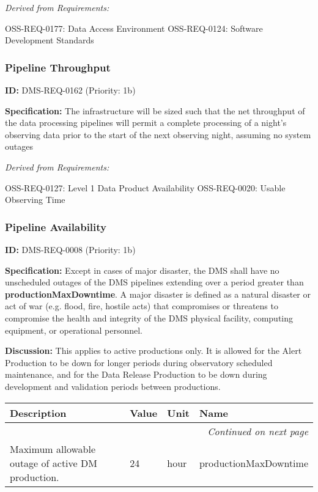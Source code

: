 \documentclass[SE,toc,lsstdraft]{lsstdoc}
\makeatletter
\newcommand{\paramname}[1]{\hspace{0pt}#1}
\newcommand{\unitname}[1]{\hspace{0pt}#1}
\newenvironment{parameters}[0]{%
\setlength\LTleft{0pt}
\setlength\LTright{\fill}
\begin{small}
\begin{longtable}[]{|p{0.49\textwidth}|l|p{0.6in}|p{1.70in}@{}|}

\hline \textbf{Description} & \textbf{Value} & \textbf{Unit} & \textbf{Name} \\ \hline
\endhead

\hline \multicolumn{4}{r}{\emph{Continued on next page}} \\
\endfoot

\hline\hline
\endlastfoot
}{%
\hline
\end{longtable}
\end{small}
}
\makeatother
\begin{document}
\emph{Derived from Requirements:}

OSS-REQ-0177:
Data Access Environment \newline
OSS-REQ-0124:
Software Development Standards \newline

\subsubsection{Pipeline Throughput}

\label{DMS-REQ-0162}
\textbf{ID:} DMS-REQ-0162 (Priority: 1b)

\textbf{Specification:} The infrastructure will be sized such that the net throughput of the data processing pipelines will permit a complete processing of a night’s observing data prior to the start of the next observing night, assuming no system outages

\emph{Derived from Requirements:}

OSS-REQ-0127:
Level 1 Data Product Availability \newline
OSS-REQ-0020:
Usable Observing Time \newline

\subsubsection{Pipeline Availability}

\label{DMS-REQ-0008}
\textbf{ID:} DMS-REQ-0008 (Priority: 1b)

\textbf{Specification:} Except in cases of major disaster, the DMS shall have no unscheduled outages of the DMS pipelines extending over a period greater than \textbf{productionMaxDowntime}.  A major disaster is defined as a natural disaster or act of war (e.g. flood, fire, hostile acts) that compromises or threatens to compromise the health and integrity of the DMS physical facility, computing equipment, or operational personnel.

\textbf{Discussion:} This applies to active productions only. It is allowed for the Alert Production to be down for longer periods during observatory scheduled maintenance, and for the Data Release Production to be down during development and validation periods between productions.

\begin{parameters}
Maximum allowable outage of active DM production.
&
24
&
\unitname{%
hour
}
&
\paramname{%
productionMaxDowntime
} \\\hline
\end{parameters}
\end{document}
